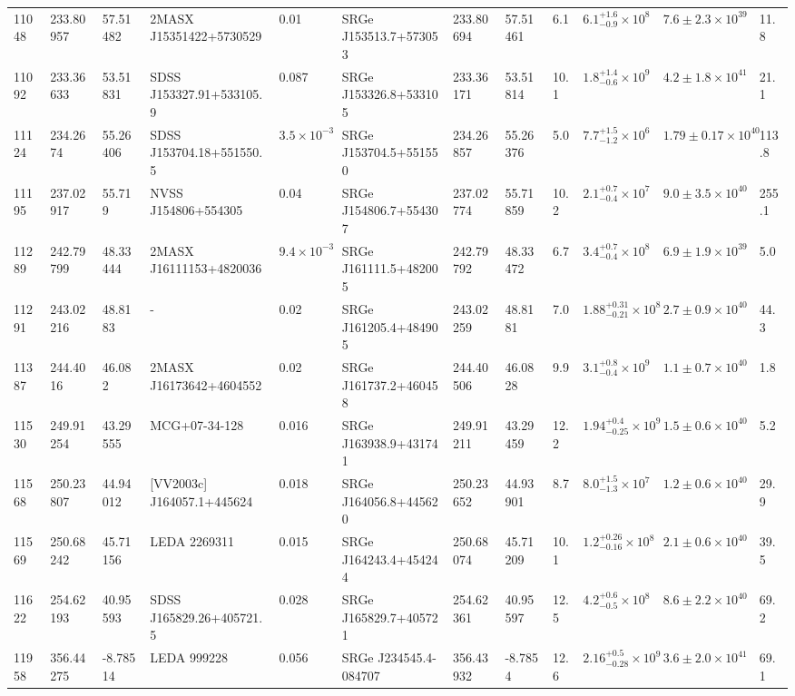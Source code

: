 \begin{longtable}{llllllllllll}
11048 & 233.80957 & 57.51482 & 2MASX J15351422+5730529 & 0.01 & SRGe J153513.7+573053 & 233.80694 & 57.51461 & 6.1 & $6.1^{+1.6}_{-0.9}\times10^{8}$ & $7.6\pm2.3\times10^{39}$ & 11.8 \\
11092 & 233.36633 & 53.51831 & SDSS J153327.91+533105.9 & 0.087 & SRGe J153326.8+533105 & 233.36171 & 53.51814 & 10.1 & $1.8^{+1.4}_{-0.6}\times10^{9}$ & $4.2\pm1.8\times10^{41}$ & 21.1 \\
11124 & 234.2674 & 55.26406 & SDSS J153704.18+551550.5 & $3.5\times10^{-3}$ & SRGe J153704.5+551550 & 234.26857 & 55.26376 & 5.0 & $7.7^{+1.5}_{-1.2}\times10^{6}$ & $1.79\pm0.17\times10^{40}$ & 113.8 \\
11195 & 237.02917 & 55.719 & NVSS J154806+554305 & 0.04 & SRGe J154806.7+554307 & 237.02774 & 55.71859 & 10.2 & $2.1^{+0.7}_{-0.4}\times10^{7}$ & $9.0\pm3.5\times10^{40}$ & 255.1 \\
11289 & 242.79799 & 48.33444 & 2MASX J16111153+4820036 & $9.4\times10^{-3}$ & SRGe J161111.5+482005 & 242.79792 & 48.33472 & 6.7 & $3.4^{+0.7}_{-0.4}\times10^{8}$ & $6.9\pm1.9\times10^{39}$ & 5.0 \\
11291 & 243.02216 & 48.8183 & - & 0.02 & SRGe J161205.4+484905 & 243.02259 & 48.8181 & 7.0 & $1.88^{+0.31}_{-0.21}\times10^{8}$ & $2.7\pm0.9\times10^{40}$ & 44.3 \\
11387 & 244.4016 & 46.082 & 2MASX J16173642+4604552 & 0.02 & SRGe J161737.2+460458 & 244.40506 & 46.0828 & 9.9 & $3.1^{+0.8}_{-0.4}\times10^{9}$ & $1.1\pm0.7\times10^{40}$ & 1.8 \\
11530 & 249.91254 & 43.29555 & MCG+07-34-128 & 0.016 & SRGe J163938.9+431741 & 249.91211 & 43.29459 & 12.2 & $1.94^{+0.4}_{-0.25}\times10^{9}$ & $1.5\pm0.6\times10^{40}$ & 5.2 \\
11568 & 250.23807 & 44.94012 & [VV2003c] J164057.1+445624 & 0.018 & SRGe J164056.8+445620 & 250.23652 & 44.93901 & 8.7 & $8.0^{+1.5}_{-1.3}\times10^{7}$ & $1.2\pm0.6\times10^{40}$ & 29.9 \\
11569 & 250.68242 & 45.71156 & LEDA 2269311 & 0.015 & SRGe J164243.4+454244 & 250.68074 & 45.71209 & 10.1 & $1.2^{+0.26}_{-0.16}\times10^{8}$ & $2.1\pm0.6\times10^{40}$ & 39.5 \\
11622 & 254.62193 & 40.95593 & SDSS J165829.26+405721.5 & 0.028 & SRGe J165829.7+405721 & 254.62361 & 40.95597 & 12.5 & $4.2^{+0.6}_{-0.5}\times10^{8}$ & $8.6\pm2.2\times10^{40}$ & 69.2 \\
11958 & 356.44275 & -8.78514 & LEDA  999228 & 0.056 & SRGe J234545.4-084707 & 356.43932 & -8.7854 & 12.6 & $2.16^{+0.5}_{-0.28}\times10^{9}$ & $3.6\pm2.0\times10^{41}$ & 69.1 \\

\end{longtable}
